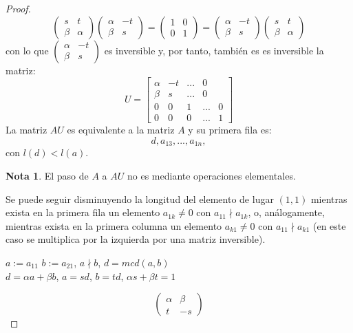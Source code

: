 \documentclass{article}
\theoremstyle{theorem-style}  %
\theoremstyle{definition}
\newtheorem*{note}{Nota} %
\theoremstyle{example-style}
\begin{document}
\begin{proof}
\[\begin{pmatrix}
		s & t \\
		\beta & \alpha
		\end{pmatrix} 
		\begin{pmatrix}
		 \alpha & -t \\
		\beta & s
		\end{pmatrix} = 
		\begin{pmatrix}
		1 & 0\\
		0 & 1
		\end{pmatrix} =
		\begin{pmatrix}
		\alpha & -t \\
		\beta & s
		\end{pmatrix} 
		\begin{pmatrix}
		s & t \\
		\beta & \alpha
		\end{pmatrix} 
		\]
		con lo que $\begin{pmatrix}
		\alpha & -t \\
		\beta & s
		\end{pmatrix} $ es inversible y, por tanto, también es es inversible la matriz:
		\[U = \begin{bmatrix}
		\alpha & -t & ... & 0 \\
		\beta & s & ... & 0\\
		0  & 0 & 1 & ... & 0 \\
		0 & 0 & 0 & ... & 1
		\end{bmatrix}\]
		La matriz $AU$ es equivalente a la matriz $A$ y su primera fila es:
		\[d, a_{13}, ..., a_ {1n},\]
		con $l(d) < l(a)$. 
		\begin{note}
			El paso de $A$ a $AU$ no es mediante operaciones elementales.
		\end{note}
		Se puede seguir disminuyendo la longitud del elemento de lugar $(1, 1)$ mientras exista en la primera fila un elemento $a_{1k} \neq 0$ con $a_{11} \nmid a_{1k}$, o, análogamente, mientras exista en la primera columna un elemento $a_{k1} \neq 0$ con $a_{11} \nmid a_{k1}$ (en este caso se multiplica por la izquierda por una matriz inversible).
		\begin{center}
			$a:= a_{11} $ $b:= a_{21}$, $a \nmid b$, $d = mcd(a, b)$ \\
			$d = \alpha a + \beta b$, $a = sd$, $b = td$, $\alpha s + \beta t = 1$ \\
		\end{center}
		\[\begin{pmatrix}
		\alpha & \beta \\
		 t & -s 
		\end{pmatrix} 
\]
\end{proof}
\end{document}

